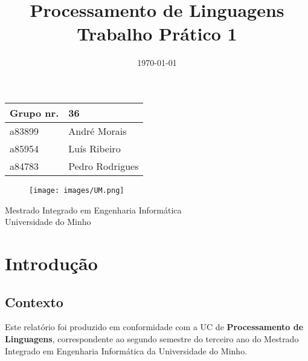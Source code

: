 \documentclass[12pt]{article}
\title{
    \Huge Processamento de Linguagens\\
    \normalsize \textbf{Trabalho Prático 1}
}
\date{\today}
\begin{document}
\begin{titlepage}

    \maketitle
    \begin{center}\large

        \begin{tabular}{ll}
            \textbf{Grupo} nr. & 36
            \\\hline
            a83899 & André Morais
            \\
            a85954 & Luís Ribeiro
            \\
            a84783 & Pedro Rodrigues
        \end{tabular}

    \end{center}

    \vfill

    \begin{figure}[h]
        \centering
        \texttt{[image: images/UM.png]}
    \end{figure}

    \begin{center}
        \large Mestrado Integrado em Engenharia Informática\\
        Universidade do Minho
    \end{center}

\end{titlepage}

\tableofcontents{}

\newpage

\section{Introdução}

\vspace{1cm}

\subsection{Contexto}

\vspace{0.5cm}

Este relatório foi produzido em conformidade com a UC de \textbf{Processamento de Linguagens}, correspondente ao segundo semestre do terceiro ano do Mestrado Integrado em Engenharia Informática da Universidade do Minho.\\
\end{document}

